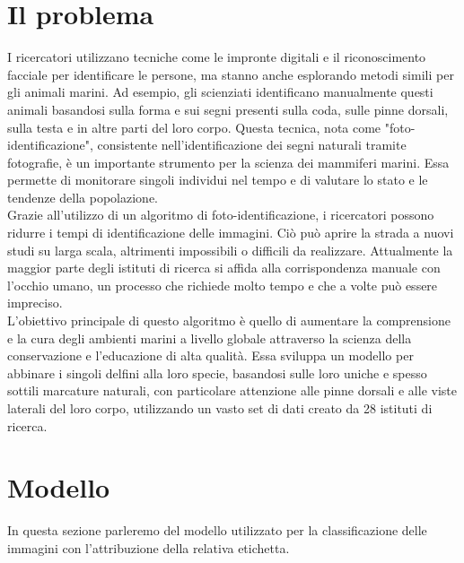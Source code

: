 \documentclass[a4paper,final,12pt]{report}
\begin{document}
\section{Il problema}
I ricercatori utilizzano tecniche come le impronte digitali e il riconoscimento facciale per identificare le persone, ma stanno anche esplorando metodi simili per gli animali marini. Ad esempio, gli scienziati identificano manualmente questi animali basandosi sulla forma e sui segni presenti sulla coda, sulle pinne dorsali, sulla testa e in altre parti del loro corpo. Questa tecnica, nota come "foto-identificazione", consistente nell'identificazione dei segni naturali tramite fotografie, è un importante strumento per la scienza dei mammiferi marini. Essa permette di monitorare singoli individui nel tempo e di valutare lo stato e le tendenze della popolazione.\\

Grazie all'utilizzo di un algoritmo di foto-identificazione, i ricercatori possono ridurre i tempi di identificazione delle immagini. Ciò può aprire la strada a nuovi studi su larga scala, altrimenti impossibili o difficili da realizzare. Attualmente la maggior parte degli istituti di ricerca si affida alla corrispondenza manuale con l'occhio umano, un processo che richiede molto tempo e che a volte può essere impreciso.\\

L'obiettivo principale di questo algoritmo è quello di aumentare la comprensione e la cura degli ambienti marini a livello globale attraverso la scienza della conservazione e l'educazione di alta qualità. Essa sviluppa un modello per abbinare i singoli delfini alla loro specie, basandosi sulle loro uniche e spesso sottili marcature naturali, con particolare attenzione alle pinne dorsali e alle viste laterali del loro corpo, utilizzando un vasto set di dati creato da 28 istituti di ricerca.\\

\section{Modello}
In questa sezione parleremo del modello utilizzato per la classificazione delle immagini con l'attribuzione della relativa etichetta.
\end{document}
